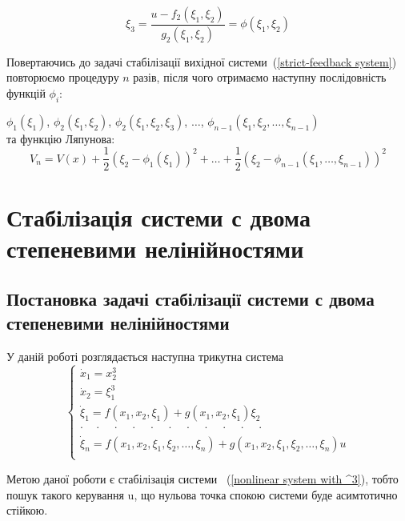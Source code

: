 \documentclass{article}
\begin{document}
\begin{equation}
    \xi_3 = \frac{u - f_2(\xi_1, \xi_2)}{g_2(\xi_1, \xi_2)} = \phi(\xi_1,\xi_2)
\end{equation}

Повертаючись до задачі стабілізації вихідної системи~(\ref{strict-feedback system}) 
повторюємо процедуру $n$ разів, після чого отримаємо наступну послідовність функцій $\phi_i$:

$\phi_1(\xi_1)$, $\phi_2(\xi_1,\xi_2)$, $\phi_2(\xi_1,\xi_2,\xi_3)$, $\dots$,
$\phi_{n-1}(\xi_1,\xi_2, \dots, \xi_{n-1})$\\
та функцію Ляпунова:
\begin{equation}
    V_n = V(x)+\frac{1}{2}(\xi_2-\phi_1(\xi_1))^2 + \dots 
    +\frac{1}{2}(\xi_2-\phi_{n-1}(\xi_1, \dots, \xi_{n-1}))^2
\end{equation}

\pagebreak
\section{Стабілізація системи с двома степеневими нелінійностями}
\subsection{Постановка задачі стабілізації системи с двома степеневими нелінійностями}
У даній роботі розглядається наступна трикутна система
\begin{equation}\label{nonlinear system with ^3}
    \begin{cases}
    \dot x_1 = x_2^3 \\
    \dot x_2 = \xi_1^3\\
    \dot \xi_1 = f(x_1, x_2,\xi_1) + g(x_1, x_2, \xi_1)\xi_2 \\
    \cdot \quad \cdot \quad \cdot \quad \cdot  \quad \cdot  \quad \cdot
    \quad \cdot  \quad \cdot  \quad \cdot  \quad \cdot  \quad \cdot\\
    \dot \xi_n = f(x_1, x_2,\xi_1,\xi_2, \dots, \xi_n) + 
    g(x_1, x_2, \xi_1,\xi_2, \dots, \xi_n)u \\
    \end{cases}
\end{equation}

Метою даної роботи є стабілізація системи ~(\ref{nonlinear system with ^3}), тобто пошук такого
керування u, що нульова точка спокою системи буде асимтотично стійкою. 
\end{document}

